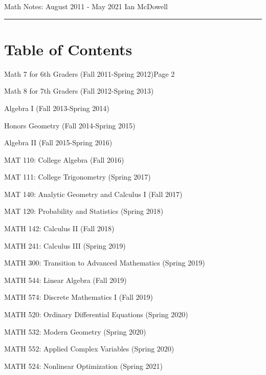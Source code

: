 \documentclass{article}
\begin{document}
 	\noindent\Large{Math Notes: August 2011 - May 2021 \hfill Ian McDowell}
	\noindent\hrule

	\section*{Table of Contents}
	\begin{enumerate*}
		\item Math 7 for 6th Graders (Fall 2011-Spring 2012)\hfill Page 2
		\item Math 8 for 7th Graders (Fall 2012-Spring 2013)
		\item Algebra I (Fall 2013-Spring 2014)
		\item Honors Geometry (Fall 2014-Spring 2015)
		\item Algebra II (Fall 2015-Spring 2016)
		\item MAT 110: College Algebra (Fall 2016)
		\item MAT 111: College Trigonometry (Spring 2017)
		\item MAT 140: Analytic Geometry and Calculus I (Fall 2017)
		\item MAT 120: Probability and Statistics (Spring 2018)
		\item MATH 142: Calculus II (Fall 2018)
		\item MATH 241: Calculus III (Spring 2019)
		\item MATH 300: Transition to Advanced Mathematics (Spring 2019)
		\item MATH 544: Linear Algebra (Fall 2019)
		\item MATH 574: Discrete Mathematics I (Fall 2019)
		\item MATH 520: Ordinary Differential Equations (Spring 2020)
		\item MATH 532: Modern Geometry (Spring 2020)
		\item MATH 552: Applied Complex Variables (Spring 2020)
		\item MATH 524: Nonlinear Optimization (Spring 2021)
	\end{enumerate*}

	
\end{document}
